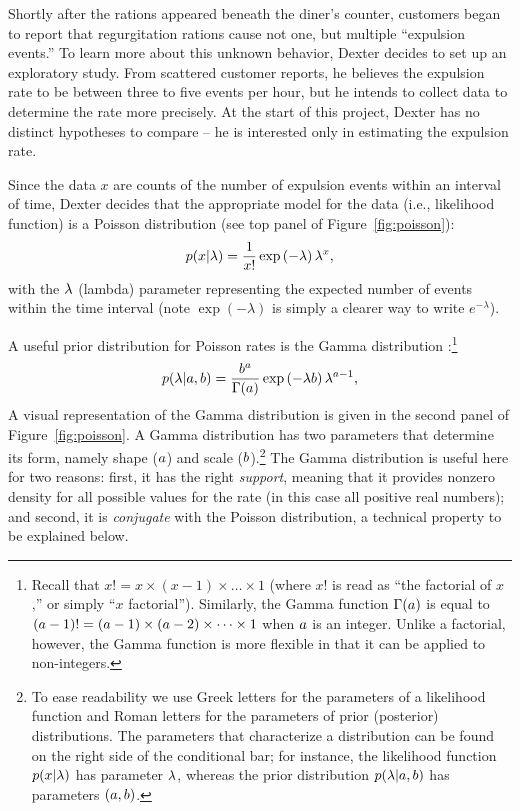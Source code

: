 Shortly after the rations appeared beneath the diner's counter, customers began to report that regurgitation rations cause not one, but multiple ``expulsion events.'' To learn more about this unknown behavior, Dexter decides to set up an exploratory study. From scattered customer reports, he believes the expulsion rate to be between three to five events per hour, but he intends to collect data to determine the rate more precisely. At the start of this project, Dexter has no distinct hypotheses to compare -- he is interested only in estimating the expulsion rate.

Since the data $x$ are counts of the number of expulsion events within an interval of time, Dexter decides that the appropriate model for the data (i.e., likelihood function) is a Poisson distribution {(see top panel of Figure~\ref{fig:poisson})}:
\begin{equation}\label{eq:poisson}
  p(x|\lambda) = \frac{1}{x!} \exp\left(-\lambda\right) \lambda^x,
\end{equation}
with the $\lambda$ (lambda) parameter representing the expected number of events within the time interval (note $\exp(-\lambda)$ is simply a clearer way to write $e^{-\lambda}$). 

A useful prior distribution for Poisson rates is the Gamma distribution \cite[Appendix~A]{GelmanEtAl2004}:\footnote{Recall that $x!=x\times (x-1) \times \dots\times 1$ (where $x!$ is read as ``the factorial of $x$,'' or simply ``$x$ factorial''). Similarly, the Gamma function $\Gamma(a)$ is equal to $(a-1)!=(a-1)\times(a-2)\times\dots\times 1$ when $a$ is an integer. Unlike a factorial, however, the Gamma function is more flexible in that it can be applied to non-integers.}
\begin{equation}\label{eq:gamma}
  p(\lambda|a,b) = \frac{b^a}{\Gamma(a)} \exp\left(-\lambda b\right) \lambda^{a - 1},
\end{equation}
A visual representation of the Gamma distribution is given in the second panel of Figure~\ref{fig:poisson}. A Gamma distribution has two parameters that determine its form, namely shape ($a$) and scale ($b$).\footnote{To ease readability we use Greek letters for the parameters of a likelihood function and Roman letters for the parameters of prior (posterior) distributions. The parameters that characterize a distribution can be found on the right side of the conditional bar; for instance, the likelihood function $p(x|\lambda)$ has parameter $\lambda$, whereas the prior distribution $p(\lambda|a,b)$ has parameters $(a,b)$.} The Gamma distribution is useful here for two reasons: first, it has the right \emph{support}, meaning that it provides nonzero density for all possible values for the rate (in this case all positive real numbers); and second, it is \emph{conjugate} with the Poisson distribution, a technical property to be explained below.

